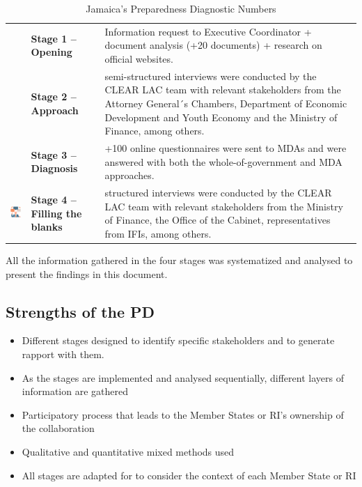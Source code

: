 \documentclass[
  10pt,
]{book}
\begin{document}
\begin{longtable}[]{@{}
  >{\raggedright\arraybackslash}p{}
  >{\centering\arraybackslash}p{}
  >{\raggedleft\arraybackslash}p{}@{}}
\caption{\label{tab:table1} Jamaica's Preparedness Diagnostic Numbers}\tabularnewline
\toprule
\endhead
& \textbf{Stage 1 -- Opening} & Information request to Executive Coordinator + document analysis (+20 documents) + research on official websites. \\
& \textbf{Stage 2 -- Approach} & 4 semi-structured interviews were conducted by the CLEAR LAC team with relevant stakeholders from the Attorney General´s Chambers, Department of Economic Development and Youth Economy and the Ministry of Finance, among others. \\
& \textbf{Stage 3 -- Diagnosis} & +100 online questionnaires were sent to MDAs and were answered with both the whole-of-government and MDA approaches. \\
\includegraphics{./images/tb1_4.png} & \textbf{Stage 4 -- Filling the blanks} & 5 structured interviews were conducted by the CLEAR LAC team with relevant stakeholders from the Ministry of Finance, the Office of the Cabinet, representatives from IFIs, among others. \\
\bottomrule
\end{longtable}

All the information gathered in the four stages was systematized and analysed to present the findings in this document.

\hypertarget{strengths-of-the-pd}{%
\subsection*{Strengths of the PD}\label{strengths-of-the-pd}}

\begin{itemize}
\item
  Different stages designed to identify specific stakeholders and to generate rapport with them.
\item
  As the stages are implemented and analysed sequentially, different layers of information are gathered
\item
  Participatory process that leads to the Member States or RI's ownership of the collaboration
\item
  Qualitative and quantitative mixed methods used
\item
  All stages are adapted for to consider the context of each Member State or RI
\end{itemize}
\end{document}
